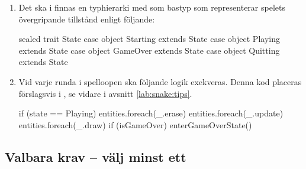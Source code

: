 \begin{enumerate}[label={$\square$}, leftmargin=*]
\item Det ska i  finnas en typhierarki med  som bastyp som representerar spelets övergripande tillstånd enligt följande:
\begin{Code}
sealed trait State
case object Starting extends State
case object Playing  extends State
case object GameOver extends State
case object Quitting extends State
\end{Code}

\item Vid varje runda i spelloopen ska följande logik exekveras. Denna kod placeras förslagsvis i , se vidare  i avsnitt \ref{lab:snake:tips}.
\begin{Code}
if (state == Playing) {
  entities.foreach(_.erase)
  entities.foreach(_.update)
  entities.foreach(_.draw)
  if (isGameOver) enterGameOverState()
}
\end{Code}

\end{enumerate}



\subsection{Valbara krav -- välj minst ett}\label{lab:snake:extra-reqts}

